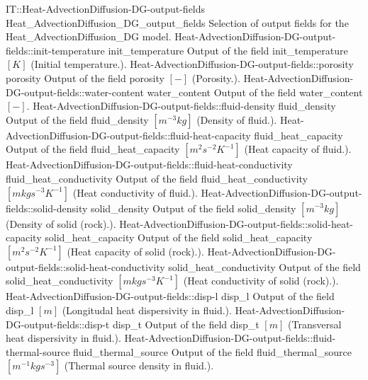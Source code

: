 \begin{SelectionType}
	{IT::Heat-AdvectionDiffusion-DG-output-fields}
	{Heat{\_}AdvectionDiffusion{\_}DG{\_}output{\_}fields}
	{{{Selection of output fields for the Heat{\_}AdvectionDiffusion{\_}DG model.}}}
		\SelectionItem
			{Heat-AdvectionDiffusion-DG-output-fields::init-temperature}
			{init{\_}temperature}
			{{{Output of the field init{\_}temperature }{$[K]$}{ (Initial temperature.).}}}
		\SelectionItem
			{Heat-AdvectionDiffusion-DG-output-fields::porosity}
			{porosity}
			{{{Output of the field porosity }{$[-]$}{ (Porosity.).}}}
		\SelectionItem
			{Heat-AdvectionDiffusion-DG-output-fields::water-content}
			{water{\_}content}
			{{{Output of the field water{\_}content }{$[-]$}{.}}}
		\SelectionItem
			{Heat-AdvectionDiffusion-DG-output-fields::fluid-density}
			{fluid{\_}density}
			{{{Output of the field fluid{\_}density }{$[m^{-3}kg]$}{ (Density of fluid.).}}}
		\SelectionItem
			{Heat-AdvectionDiffusion-DG-output-fields::fluid-heat-capacity}
			{fluid{\_}heat{\_}capacity}
			{{{Output of the field fluid{\_}heat{\_}capacity }{$[m^{2}s^{-2}K^{-1}]$}{ (Heat capacity of fluid.).}}}
		\SelectionItem
			{Heat-AdvectionDiffusion-DG-output-fields::fluid-heat-conductivity}
			{fluid{\_}heat{\_}conductivity}
			{{{Output of the field fluid{\_}heat{\_}conductivity }{$[mkgs^{-3}K^{-1}]$}{ (Heat conductivity of fluid.).}}}
		\SelectionItem
			{Heat-AdvectionDiffusion-DG-output-fields::solid-density}
			{solid{\_}density}
			{{{Output of the field solid{\_}density }{$[m^{-3}kg]$}{ (Density of solid (rock).).}}}
		\SelectionItem
			{Heat-AdvectionDiffusion-DG-output-fields::solid-heat-capacity}
			{solid{\_}heat{\_}capacity}
			{{{Output of the field solid{\_}heat{\_}capacity }{$[m^{2}s^{-2}K^{-1}]$}{ (Heat capacity of solid (rock).).}}}
		\SelectionItem
			{Heat-AdvectionDiffusion-DG-output-fields::solid-heat-conductivity}
			{solid{\_}heat{\_}conductivity}
			{{{Output of the field solid{\_}heat{\_}conductivity }{$[mkgs^{-3}K^{-1}]$}{ (Heat conductivity of solid (rock).).}}}
		\SelectionItem
			{Heat-AdvectionDiffusion-DG-output-fields::disp-l}
			{disp{\_}l}
			{{{Output of the field disp{\_}l }{$[m]$}{ (Longitudal heat dispersivity in fluid.).}}}
		\SelectionItem
			{Heat-AdvectionDiffusion-DG-output-fields::disp-t}
			{disp{\_}t}
			{{{Output of the field disp{\_}t }{$[m]$}{ (Transversal heat dispersivity in fluid.).}}}
		\SelectionItem
			{Heat-AdvectionDiffusion-DG-output-fields::fluid-thermal-source}
			{fluid{\_}thermal{\_}source}
			{{{Output of the field fluid{\_}thermal{\_}source }{$[m^{-1}kgs^{-3}]$}{ (Thermal source density in fluid.).}}}

\end{SelectionType}
